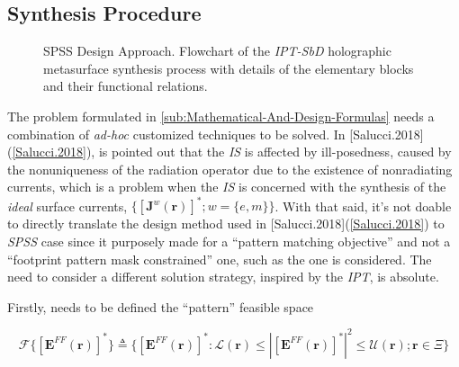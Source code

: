 \subsection{Synthesis Procedure \label{sub:Synthesis-Procedure}}

%
\begin{figure}[H]


\caption{\footnotesize\label{cap:Design}SPSS Design Approach. Flowchart of the \emph{IPT-SbD}
holographic metasurface synthesis process with details of the elementary
blocks and their functional relations.}
\end{figure}


The problem formulated in \ref{sub:Mathematical-And-Design-Formulas}
needs a combination of \emph{ad-hoc} customized techniques to be solved.
In {[}Salucci.2018{]}(\ref{Salucci.2018}), is pointed out that the
\emph{IS} is affected by ill-posedness, caused by the nonuniqueness
of the radiation operator due to the existence of nonradiating currents,
which is a problem when the \emph{IS} is concerned with the synthesis
of the \emph{ideal} surface currents, $\{[\mathbf{J}^{w}(\mathbf{r})]^{*};w=\{ e,m\}\}$.
With that said, it's not doable to directly translate the design method
used in {[}Salucci.2018{]}(\ref{Salucci.2018}) to \emph{SPSS} case
since it purposely made for a {}``pattern matching objective'' and
not a {}``footprint pattern mask constrained'' one, such as the
one is considered. The need to consider a different solution strategy,
inspired by the \emph{IPT}, is absolute.

Firstly, needs to be defined the {}``pattern'' feasible space

\begin{equation}
\mathcal{F}\{[\mathbf{E}^{FF}(\mathbf{r})]^{*}\}\triangleq\{[\mathbf{E}^{FF}(\mathbf{r})]^{*}:\mathcal{L}(\mathbf{r})\leq|[\mathbf{E}^{FF}(\mathbf{r})]^{*}|^{2}\leq\mathcal{U}(\mathbf{r});\mathbf{r}\in\Xi\}\label{eq:18}\end{equation}


